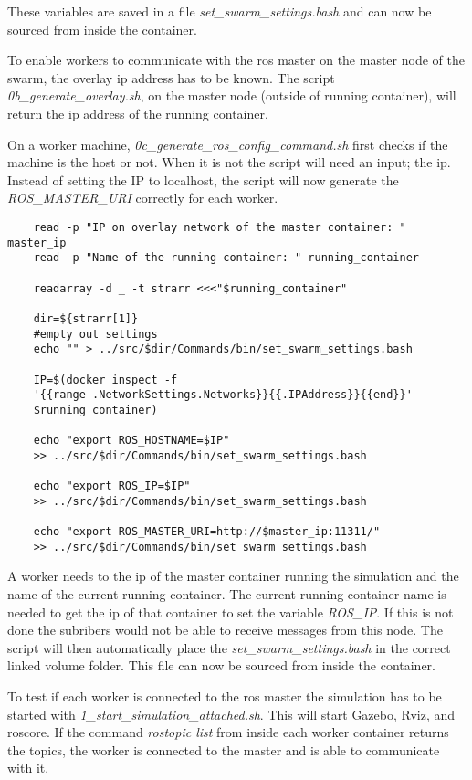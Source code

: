 These variables are saved in a file \textit{set\_swarm\_settings.bash} and can now be sourced from inside the container. 
\newpage

To enable workers to communicate with the \acs{ros} master on the master node of the swarm, the overlay \acs{ip} address 
has to be known. The script \textit{0b\_generate\_overlay.sh}, on the master node
(outside of running container), will return the 
\acs{ip} address of the running container. 

On a worker machine, \textit{0c\_generate\_ros\_config\_command.sh} first checks if the machine is the host or not. When it 
is not the script will need an input; the \acs{ip}. Instead of setting the IP to localhost, the script will now generate
the \textit{ROS\_MASTER\_URI} correctly for each worker.

\begin{verbatim}
    read -p "IP on overlay network of the master container: " master_ip
    read -p "Name of the running container: " running_container

    readarray -d _ -t strarr <<<"$running_container"

    dir=${strarr[1]}
    #empty out settings
    echo "" > ../src/$dir/Commands/bin/set_swarm_settings.bash 

    IP=$(docker inspect -f 
    '{{range .NetworkSettings.Networks}}{{.IPAddress}}{{end}}' 
    $running_container)
    
    echo "export ROS_HOSTNAME=$IP" 
    >> ../src/$dir/Commands/bin/set_swarm_settings.bash 

    echo "export ROS_IP=$IP" 
    >> ../src/$dir/Commands/bin/set_swarm_settings.bash  

    echo "export ROS_MASTER_URI=http://$master_ip:11311/" 
    >> ../src/$dir/Commands/bin/set_swarm_settings.bash
\end{verbatim}

A worker needs to the \acs{ip} of the master container running the simulation and the name of the current running container. 
The current running container name is needed to get the \acs{ip} of that container to set the variable \textit{ROS\_IP}. If this is not done 
the subribers would not be able to receive messages from this node.
The script will then automatically place the \textit{set\_swarm\_settings.bash} in the correct linked volume folder. This file can now be sourced
from inside the container.

To test if each worker is connected to the \acs{ros} master the simulation has to be 
started with \textit{1\_start\_simulation\_attached.sh}. This will start Gazebo, Rviz, and roscore. If the command 
\textit{rostopic list} from inside each worker container returns the topics, the worker is connected to the master 
and is able to communicate with it.